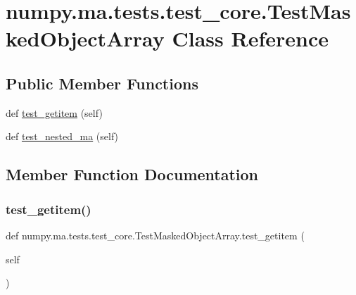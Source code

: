 \hypertarget{classnumpy_1_1ma_1_1tests_1_1test__core_1_1TestMaskedObjectArray}{}\section{numpy.\+ma.\+tests.\+test\+\_\+core.\+Test\+Masked\+Object\+Array Class Reference}
\label{classnumpy_1_1ma_1_1tests_1_1test__core_1_1TestMaskedObjectArray}
\subsection*{Public Member Functions}
\begin{DoxyCompactItemize}
\item 
def \hyperlink{classnumpy_1_1ma_1_1tests_1_1test__core_1_1TestMaskedObjectArray_ad50d213adfd95a2558458320e2c89633}{test\+\_\+getitem} (self)
\item 
def \hyperlink{classnumpy_1_1ma_1_1tests_1_1test__core_1_1TestMaskedObjectArray_a28b83450bd9d9bbffb2f8f751b33bed1}{test\+\_\+nested\+\_\+ma} (self)
\end{DoxyCompactItemize}


\subsection{Member Function Documentation}
\mbox{\label{classnumpy_1_1ma_1_1tests_1_1test__core_1_1TestMaskedObjectArray_ad50d213adfd95a2558458320e2c89633}} 
\subsubsection{\texorpdfstring{test\+\_\+getitem()}{test\_getitem()}}
{\footnotesize\ttfamily def numpy.\+ma.\+tests.\+test\+\_\+core.\+Test\+Masked\+Object\+Array.\+test\+\_\+getitem (\begin{DoxyParamCaption}\item[{}]{self }\end{DoxyParamCaption})}


